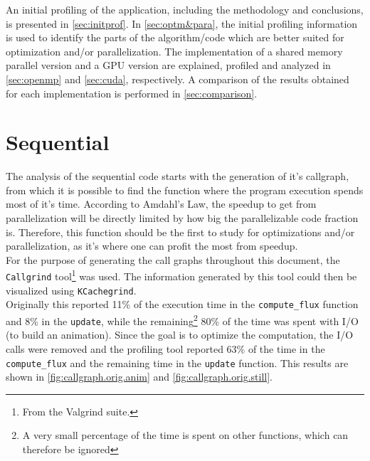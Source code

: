 \documentclass[9pt,twocolumn]{scrartcl}
\begin{document}
An initial profiling of the application, including the methodology and conclusions, is presented in \autoref{sec:initprof}. In \autoref{sec:optm&para}, the initial profiling information is used to identify the parts of the algorithm/code which are better suited for optimization and/or parallelization. The implementation of a shared memory parallel version and a GPU version are explained, profiled and analyzed in \autoref{sec:openmp}  and \autoref{sec:cuda}, respectively. A comparison of the results obtained for each implementation is performed in \autoref{sec:comparison}.\\

\section{Sequential}%
\label{sec:initprof}
The analysis of the sequential code starts with the generation of it's callgraph, from which it is possible to find the function where the program execution spends most of it's time. According to Amdahl's Law, the speedup to get from parallelization will be directly limited by how big the parallelizable code fraction is. Therefore, this function should be the first to study for optimizations and/or parallelization, as it's where one can profit the most from speedup.\\

For the purpose of generating the call graphs throughout this document, the \texttt{Callgrind} tool\footnote{From the Valgrind suite.} was used. The information generated by this tool could then be visualized using \texttt{KCachegrind}.\\

Originally this reported 11\% of the execution time in the \texttt{compute\_flux} function and 8\% in the \texttt{update}, while the remaining\footnote{A very small percentage of the time is spent on other functions, which can therefore be ignored} 80\% of the time was spent with I/O (to build an animation). Since the goal is to optimize the computation, the I/O calls were removed and the profiling tool reported 63\% of the time in the \texttt{compute\_flux} and the remaining time in the \texttt{update} function. This results are shown in \autoref{fig:callgraph.orig.anim} and \autoref{fig:callgraph.orig.still}.\\
\end{document}
